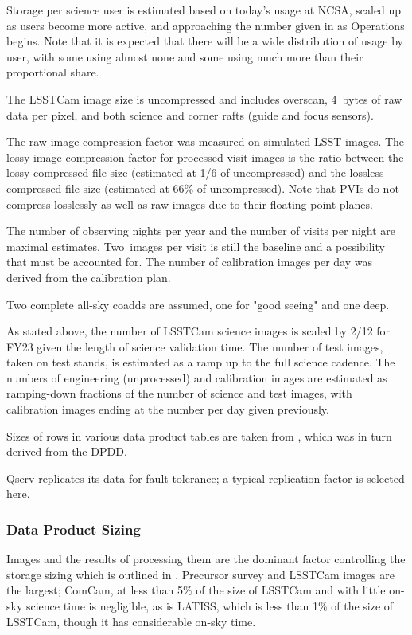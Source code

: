 Storage per science user is estimated based on today's usage at NCSA, scaled up as users become more active, and approaching the number given in  as Operations begins.
Note that it is expected that there will be a wide distribution of usage by user, with some using almost none and some using much more than their proportional share.

The LSSTCam image size is uncompressed and includes overscan, 4~bytes of raw data per pixel, and both science and corner rafts (guide and focus sensors).

The raw image compression factor was measured on simulated LSST images.
The lossy image compression factor for processed visit images is the ratio between the lossy-compressed file size (estimated at 1/6 of uncompressed) and the lossless-compressed file size (estimated at 66\% of uncompressed).
Note that PVIs do not compress losslessly as well as raw images due to their floating point planes.

The number of observing nights per year and the number of visits per night are maximal estimates.
Two~images per visit is still the baseline and a possibility that must be accounted for.
The number of calibration images per day was derived from the calibration plan.

Two complete all-sky coadds are assumed, one for "good seeing" and one deep.

As stated above, the number of LSSTCam science images is scaled by 2/12 for FY23
given the length of science validation time.
The number of test images, taken on test stands, is estimated as a ramp
up to the full science cadence.
The numbers of engineering (unprocessed) and calibration images are
estimated as ramping-down fractions of the number of science and test images,
with calibration images ending at the number per day given previously.

Sizes of rows in various data product tables are taken from , which was in turn derived from the \gls{DPDD}.

Qserv replicates its data for fault tolerance; a typical replication factor is selected here.

\subsubsection{Data Product Sizing}

Images and the results of processing them are the dominant factor controlling the storage sizing which is outlined in .
Precursor survey and LSSTCam images are the largest; ComCam, at less than 5\% of the size of LSSTCam and with little on-sky science time is negligible, as is LATISS, which is less than 1\% of the size of LSSTCam, though it has considerable on-sky time.

